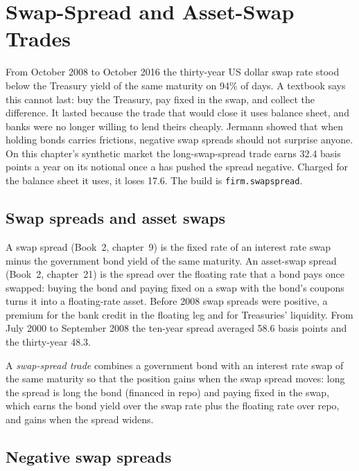 \chapter{Swap-Spread and Asset-Swap Trades}\label{ch:s2:swap-spread-and-asset-swap-trades}

From October 2008 to October 2016 the thirty-year US dollar swap rate stood below the Treasury yield of the same maturity on 94\% of days. A textbook
says this cannot last: buy the Treasury, pay fixed in the swap, and collect the difference. It lasted because the trade that would close it uses
balance sheet, and banks were no longer willing to lend theirs cheaply. Jermann showed that when holding bonds carries frictions, negative swap
spreads should not surprise anyone. On this chapter's synthetic market the long-swap-spread trade earns 32.4 basis points a year on its notional once
a  has pushed the spread negative. Charged for the balance sheet it uses, it loses 17.6. The build is \texttt{firm.swapspread}.

\section{Swap spreads and asset swaps}

A swap spread (Book~2, chapter~9) is the fixed rate of an interest rate swap minus the government bond yield of the same maturity. An asset-swap
spread (Book~2, chapter~21) is the spread over the floating rate that a bond pays once swapped: buying the bond and paying fixed on a swap with the
bond's coupons turns it into a floating-rate asset. Before 2008 swap spreads were positive, a premium for the bank credit in the floating leg and for
Treasuries' liquidity. From July 2000 to September 2008 the ten-year spread averaged 58.6 basis points and the thirty-year 48.3.

\begin{definition}\label{def:s2:swap-spread-and-asset-swap-trades:trade}
A \emph{swap-spread trade} combines a government bond with an interest rate swap of the same maturity so that the position
gains when the swap spread moves: long the spread is long the bond (financed in repo) and paying fixed in the swap, which earns the bond yield over the
swap rate plus the floating rate over repo, and gains when the spread widens.
\end{definition}

\section{Negative swap spreads}

